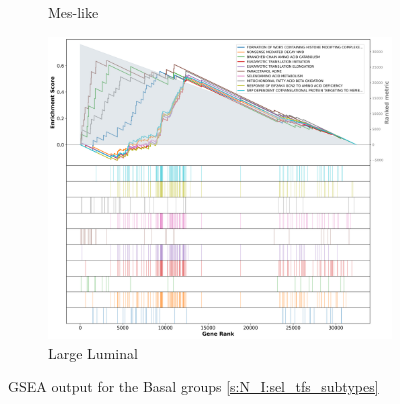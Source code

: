 \begin{figure}[!h]
\begin{subfigure}[!t]{0.4\textwidth}
        \caption{Mes-like}
        \label{fig:ap:gsea_mesLike}
    \end{subfigure} 
    \begin{subfigure}[!t]{0.4\textwidth}
        \centering
        \includegraphics[width=\textwidth,keepaspectratio]{Sections/Network_I/Resources/selective_pruning/gsea/largeLuminal_10_top_manTerms.png}
        \caption{Large Luminal}
        \label{fig:ap:gsea_largeLuminal}
    \end{subfigure}
    \caption{GSEA output for the Basal groups \cref{s:N_I:sel_tfs_subtypes}}
    \label{fig:ap:gsea_basal}
\end{figure}

\newpage


